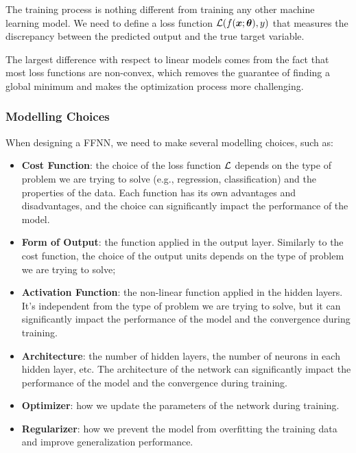 The training process is nothing different from training any other machine learning model.
We need to define a loss function $\mathcal{L}(f(\boldsymbol{x}; \boldsymbol{\theta}), y)$ that measures the discrepancy between the predicted output and the true target variable.

The largest difference with respect to linear models comes from the fact that most loss functions are non-convex, which removes the guarantee of finding a global minimum and makes the optimization process more challenging.

\subsubsection{Modelling Choices}
When designing a FFNN, we need to make several modelling choices, such as:
\begin{itemize}
    \item \textbf{Cost Function}: the choice of the loss function $\mathcal{L}$ depends on the type of problem we are trying to solve (e.g., regression, classification) and the properties of the data.
    Each function has its own advantages and disadvantages, and the choice can significantly impact the performance of the model.
    \item \textbf{Form of Output}: the function applied in the output layer. Similarly to the cost function, the choice of the output units depends on the type of problem we are trying to solve;
    \item \textbf{Activation Function}: the non-linear function applied in the hidden layers. It's independent from the type of problem we are trying to solve, but it can significantly impact the
    performance of the model and the convergence during training.
    \item \textbf{Architecture}: the number of hidden layers, the number of neurons in each hidden layer, etc. 
    The architecture of the network can significantly impact the performance of the model and the convergence during training.
    \item \textbf{Optimizer}: how we update the parameters of the network during training.
    \item \textbf{Regularizer}: how we prevent the model from overfitting the training data and improve generalization performance. 
\end{itemize}